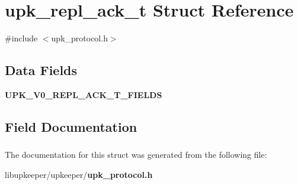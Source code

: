 \section{upk\_\-repl\_\-ack\_\-t Struct Reference}
\label{structupk__repl__ack__t}


{\ttfamily \#include $<$upk\_\-protocol.h$>$}

\subsection*{Data Fields}
\begin{DoxyCompactItemize}
\item 
{\bf UPK\_\-V0\_\-REPL\_\-ACK\_\-T\_\-FIELDS}
\end{DoxyCompactItemize}


\subsection{Field Documentation}
\subsubsection[{UPK\_\-V0\_\-REPL\_\-ACK\_\-T\_\-FIELDS}]{}\label{structupk__repl__ack__t_a53ee389198f457d645700611ac4eb61e}


The documentation for this struct was generated from the following file:\begin{DoxyCompactItemize}
\item 
libupkeeper/upkeeper/{\bf upk\_\-protocol.h}\end{DoxyCompactItemize}
